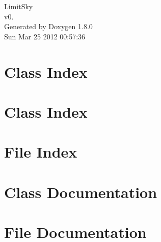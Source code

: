 \documentclass{book}
\begin{document}
\hypersetup{pageanchor=false,citecolor=blue}
\begin{titlepage}
\vspace*{7cm}
\begin{center}
{\Large Limit\-Sky \\[1ex]\large v0. }\\
\vspace*{1cm}
{\large Generated by Doxygen 1.8.0}\\
\vspace*{0.5cm}
{\small Sun Mar 25 2012 00:57:36}\\
\end{center}
\end{titlepage}
\clearemptydoublepage
{}
\tableofcontents
\clearemptydoublepage
{}
\hypersetup{pageanchor=true,citecolor=blue}
\chapter{Class Index}

\chapter{Class Index}

\chapter{File Index}

\chapter{Class Documentation}













\chapter{File Documentation}











































\printindex
\end{document}
